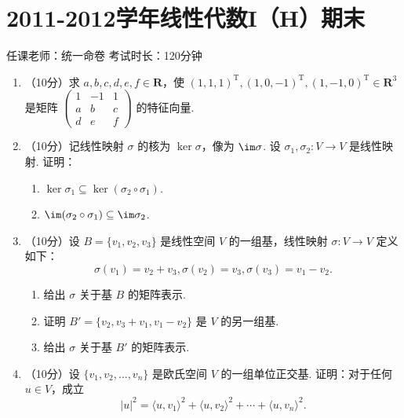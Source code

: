 \section{2011-2012学年线性代数I（H）期末}

\begin{center}
    任课老师：统一命卷\hspace{4em} 考试时长：120分钟
\end{center}

\begin{enumerate}
    \item （10分）求 $a,b,c,d,e,f\in \mathbf{R}$，使 $(1,1,1)^\mathrm{T},(1,0,-1)^\mathrm{T},(1,-1,0)^\mathrm{T}\in \mathbf{R}^3$ 是矩阵 $\begin{pmatrix}1 & -1 & 1 \\ a & b & c \\ d & e & f\end{pmatrix}$ 的特征向量.

    \item （10分）记线性映射 $\sigma$ 的核为 $\ker \sigma$，像为 $\im \sigma$.  设 $\sigma_1,\sigma_2\colon V\to V$ 是线性映射. 证明：
    \begin{enumerate}
        \item $\ker \sigma_1 \subseteq \ker (\sigma_2 \circ \sigma_1)$.

        \item $\im (\sigma_2 \circ \sigma_1) \subseteq \im \sigma_2$.
    \end{enumerate}

    \item （10分）设 $B=\{v_1,v_2,v_3\}$ 是线性空间 $V$ 的一组基，线性映射 $\sigma\colon V\to V$ 定义如下：
    \[\sigma(v_1)=v_2+v_3,\sigma(v_2)=v_3,\sigma(v_3)=v_1-v_2.\]
    \begin{enumerate}
        \item 给出 $\sigma$ 关于基 $B$ 的矩阵表示.

        \item 证明 $B'=\{v_2,v_3+v_1,v_1-v_2\}$ 是 $V$ 的另一组基.

        \item 给出 $\sigma$ 关于基 $B'$ 的矩阵表示.
    \end{enumerate}

    \item （10分）设 $\{v_1,v_2,\ldots,v_n\}$ 是欧氏空间 $V$ 的一组单位正交基. 证明：对于任何 $u\in V$，成立
    \[\lvert u \rvert^2 = \langle u,v_1\rangle^2+\langle u,v_2\rangle^2+\cdots+\langle u,v_n\rangle^2.\]


\end{enumerate}
